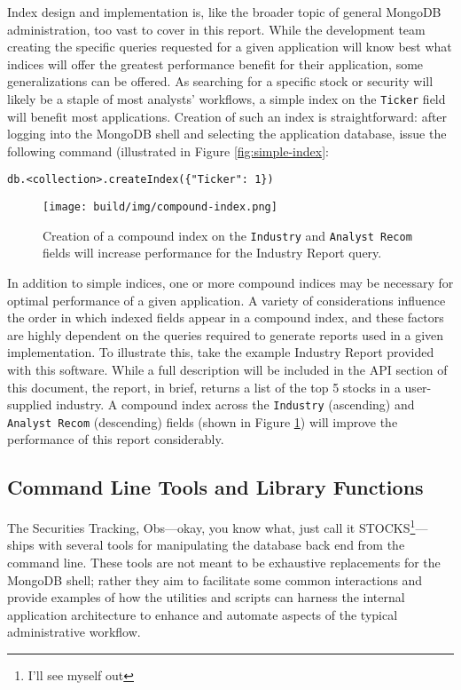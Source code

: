\documentclass[
11pt,
titlepage,
]{article}
\begin{document}
Index design and implementation is, like the broader topic of general MongoDB
administration, too vast to cover in this report. While the development team
creating the specific queries requested for a given application will know best
what indices will offer the greatest performance benefit for their application,
some generalizations can be offered. As searching for a specific stock or
security will likely be a staple of most analysts' workflows, a simple index on
the \texttt{Ticker} field will benefit most applications. Creation of such an
index is straightforward: after logging into the MongoDB shell and selecting the
application database, issue the following command (illustrated in Figure
\ref{fig:simple-index}:

\begin{lstlisting}[style=ES6]
  db.<collection>.createIndex({"Ticker": 1})
\end{lstlisting}

\begin{figure}[tbp]
  \texttt{[image: build/img/compound-index.png]}
  \caption{Creation of a compound index on the \texttt{Industry} and
    \texttt{Analyst Recom} fields will increase performance for the Industry
    Report query.}
  \label{fig:compound-index}
\end{figure}

In addition to simple indices, one or more compound indices may be necessary for
optimal performance of a given application. A variety of considerations
influence the order in which indexed fields appear in a compound index, and
these factors are highly dependent on the queries required to generate reports
used in a given implementation. To illustrate this, take the example Industry
Report provided with this software. While a full description will be included in
the API section of this document, the report, in brief, returns a list of the
top 5 stocks in a user-supplied industry. A compound index across the
\texttt{Industry} (ascending) and \texttt{Analyst Recom} (descending) fields
(shown in Figure \ref{fig:compound-index}) will improve the performance of this report
considerably.

\subsection{Command Line Tools and Library Functions}

The Securities Tracking, Obs---okay, you know what, just call it
STOCKS\footnote{I'll see myself out}---ships with several tools for manipulating
the database back end from the command line. These tools are not meant to be
exhaustive replacements for the MongoDB shell; rather they aim to facilitate
some common interactions and provide examples of how the utilities and scripts
can harness the internal application architecture to enhance and automate
aspects of the typical administrative workflow.
\end{document}
